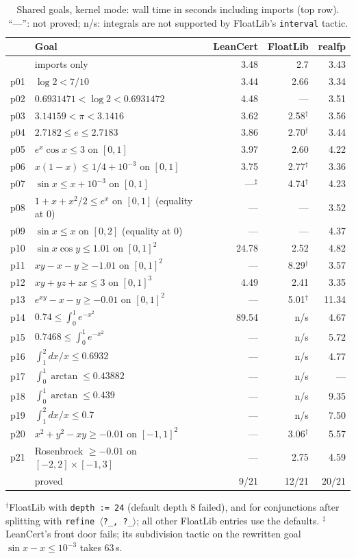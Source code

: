 \documentclass[11pt]{article}
\theoremstyle{definition}
\theoremstyle{remark}
\newcommand{\lean}[1]{\texttt{#1}}
\newcommand{\realfp}{\textsf{realfp}}
\begin{document}
\begin{table}[ht]
\centering\small
\caption{Shared goals, kernel mode: wall time in seconds including imports (top row). ``---'': not proved; n/s: integrals are not supported by FloatLib's \lean{interval} tactic.}
\label{tab:shared}
\begin{tabular}{@{}llrrr@{}}
\toprule
 & Goal & LeanCert & FloatLib & \realfp\\
\midrule
 & imports only & 3.48 & 2.7 & 3.43\\
\midrule
p01 & $\log 2<7/10$ & 3.44 & 2.66 & 3.34\\
p02 & $0.6931471<\log 2<0.6931472$ & 4.48 & --- & 3.51\\
p03 & $3.14159<\pi<3.1416$ & 3.62 & 2.58$^\dagger$ & 3.56\\
p04 & $2.7182\le e\le2.7183$ & 3.86 & 2.70$^\dagger$ & 3.44\\
p05 & $e^x\cos x\le3$ on $[0,1]$ & 3.97 & 2.60 & 4.22\\
p06 & $x(1-x)\le1/4+10^{-3}$ on $[0,1]$ & 3.75 & 2.77$^\dagger$ & 3.36\\
p07 & $\sin x\le x+10^{-3}$ on $[0,1]$ & ---$^\ddagger$ & 4.74$^\dagger$ & 4.23\\
p08 & $1+x+x^2/2\le e^x$ on $[0,1]$ (equality at 0) & --- & --- & 3.52\\
p09 & $\sin x\le x$ on $[0,2]$ (equality at 0) & --- & --- & 4.37\\
p10 & $\sin x\cos y\le1.01$ on $[0,1]^2$ & 24.78 & 2.52 & 4.82\\
p11 & $xy-x-y\ge-1.01$ on $[0,1]^2$ & --- & 8.29$^\dagger$ & 3.57\\
p12 & $xy+yz+zx\le3$ on $[0,1]^3$ & 4.49 & 2.41 & 3.35\\
p13 & $e^{xy}-x-y\ge-0.01$ on $[0,1]^2$ & --- & 5.01$^\dagger$ & 11.34\\
p14 & $0.74\le\int_0^1e^{-x^2}$ & 89.54 & n/s & 4.67\\
p15 & $0.7468\le\int_0^1e^{-x^2}$ & --- & n/s & 5.72\\
p16 & $\int_1^2 dx/x\le0.6932$ & --- & n/s & 4.77\\
p17 & $\int_0^1\arctan\le0.43882$ & --- & n/s & ---\\
p18 & $\int_0^1\arctan\le0.439$ & --- & n/s & 9.35\\
p19 & $\int_1^2 dx/x\le0.7$ & --- & n/s & 7.50\\
p20 & $x^2+y^2-xy\ge-0.01$ on $[-1,1]^2$ & --- & 3.06$^\dagger$ & 5.57\\
p21 & Rosenbrock $\ge-0.01$ on $[-2,2]\times[-1,3]$ & --- & 2.75 & 4.59\\
\midrule
 & proved & 9/21 & 12/21 & 20/21\\
\bottomrule
\end{tabular}
\smallskip
\parbox{0.95\linewidth}{\footnotesize $^\dagger$FloatLib with \lean{depth := 24} (default depth 8 failed), and for conjunctions after splitting with \lean{refine $\langle$?\_,~?\_$\rangle$}; all other FloatLib entries use the defaults. $^\ddagger$LeanCert's front door fails; its subdivision tactic on the rewritten goal $\sin x-x\le10^{-3}$ takes 63\,s.}
\end{table}
\end{document}
